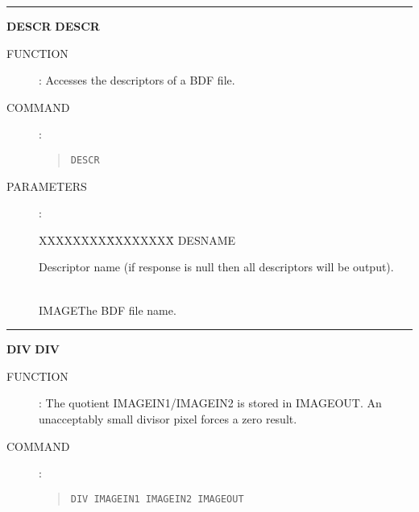 \goodbreak
\rule{\textwidth}{0.3mm}
{\Large {\bf DESCR} \hfill {\bf DESCR}}
\begin{description}
\item [FUNCTION]:
Accesses the descriptors of a BDF file.
\item [COMMAND]:
\begin{quote}
{\tt DESCR}
\end{quote}
\item [PARAMETERS] :
\begin{tabbing}
XXXXXXXX\=XXXXXXXX\=\kill
DESNAME\>\>\begin{minipage}[t]{100mm}
Descriptor name (if response is null then all descriptors will be output).
\end{minipage}\\
IMAGE\>\>The BDF file name.
\end{tabbing}
\end{description}

\goodbreak
\rule{\textwidth}{0.3mm}
{\Large {\bf DIV} \hfill {\bf DIV}}
\begin{description}
\item [FUNCTION]:
The quotient IMAGEIN1/IMAGEIN2 is stored in IMAGEOUT.
An unacceptably small divisor pixel forces a zero result.
\item [COMMAND]:
\begin{quote}
{\tt DIV  IMAGEIN1  IMAGEIN2  IMAGEOUT}
\end{quote}
\end{description}

